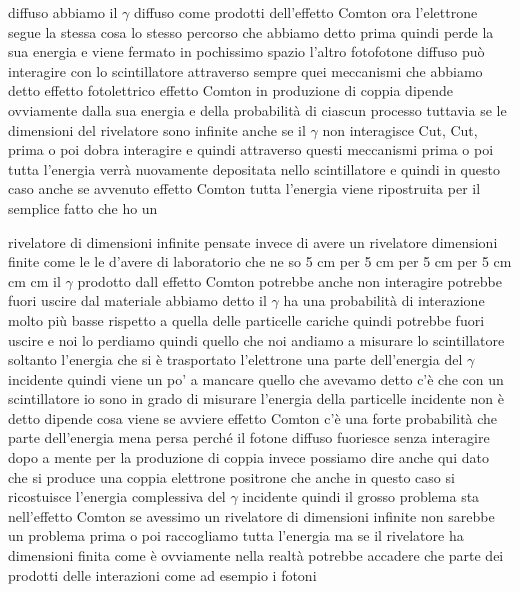 diffuso abbiamo il $\gamma$ diffuso come prodotti dell'effetto Comton ora l'elettrone segue la stessa cosa lo stesso percorso che abbiamo detto prima quindi perde la sua energia e viene fermato in pochissimo spazio l'altro fotofotone diffuso può interagire con lo scintillatore attraverso sempre quei meccanismi che abbiamo detto effetto fotolettrico effetto Comton in produzione di coppia dipende ovviamente dalla sua energia e della probabilità di ciascun processo tuttavia se le dimensioni del rivelatore sono infinite anche se il $\gamma$ non interagisce Cut, Cut, prima o poi dobra interagire e quindi attraverso questi meccanismi prima o poi tutta l'energia verrà nuovamente depositata nello scintillatore e quindi in questo caso anche se avvenuto effetto Comton tutta l'energia viene ripostruita per il semplice fatto che ho un 

rivelatore di dimensioni infinite pensate invece di avere un rivelatore dimensioni finite come le le d'avere di laboratorio che ne so 5 cm per 5 cm per 5 cm per 5 cm cm cm il $\gamma$ prodotto dall effetto Comton potrebbe anche non interagire potrebbe fuori uscire dal materiale abbiamo detto il $\gamma$ ha una probabilità di interazione molto più basse rispetto a quella delle particelle cariche quindi potrebbe fuori uscire e noi lo perdiamo quindi quello che noi andiamo a misurare lo scintillatore soltanto l'energia che si è trasportato l'elettrone una parte dell'energia del $\gamma$ incidente quindi viene un po' a mancare quello che avevamo detto c'è che con un scintillatore io sono in grado di misurare l'energia della particelle incidente non è detto dipende cosa viene se avviere effetto Comton c'è una forte probabilità che parte dell'energia mena persa perché il fotone diffuso fuoriesce senza interagire dopo a mente per la produzione di coppia invece possiamo dire anche qui dato che si produce una coppia elettrone positrone che anche in questo caso si ricostuisce l'energia complessiva del $\gamma$ incidente quindi il grosso problema sta nell'effetto Comton se avessimo un rivelatore di dimensioni infinite non sarebbe un problema prima o poi raccogliamo tutta l'energia ma se il rivelatore ha dimensioni finita come è ovviamente nella realtà potrebbe accadere che parte dei prodotti delle interazioni come ad esempio i fotoni 

